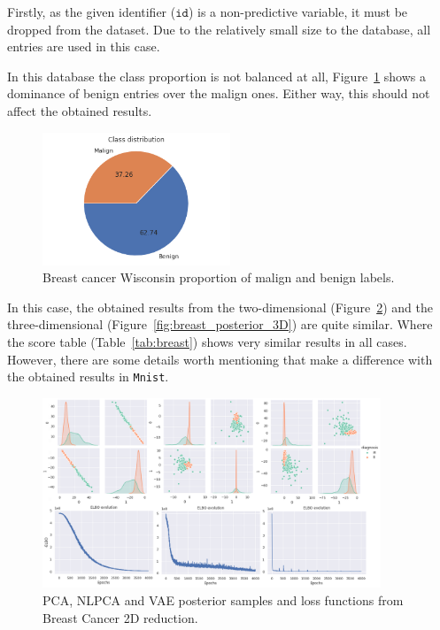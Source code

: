 Firstly, as the given identifier (\(\texttt{id}\)) is a non-predictive variable, it must be dropped from the dataset. Due to the relatively small size to the database, all entries are used in this case.

In this database the class proportion is not balanced at all, Figure~\ref{fig:breast_proportion} shows a dominance of benign entries over the malign ones. Either way, this should not affect the obtained results.

\begin{figure}
  \centering
  \includegraphics[width = 0.5\textwidth]{tex/images/breast_proportion.png}
  \caption{Breast cancer Wisconsin proportion of malign and benign labels.}\label{fig:breast_proportion}
\end{figure}

In this case, the obtained results from the two-dimensional (Figure~\ref{fig:breast_posterior_2D}) and the three-dimensional (Figure~\ref{fig:breast_posterior_3D}) are quite similar. Where the score table (Table~\ref{tab:breast}) shows very similar results in all cases. However, there are some details worth mentioning that make a difference with the obtained results in \texttt{Mnist}.



\begin{figure}[h]
  \centering
  \includegraphics[width = 0.9\textwidth]{tex/images/breast_2D.png}
  \caption{PCA, NLPCA and VAE posterior samples and loss functions from Breast Cancer 2D reduction.}\label{fig:breast_posterior_2D}
\end{figure}

